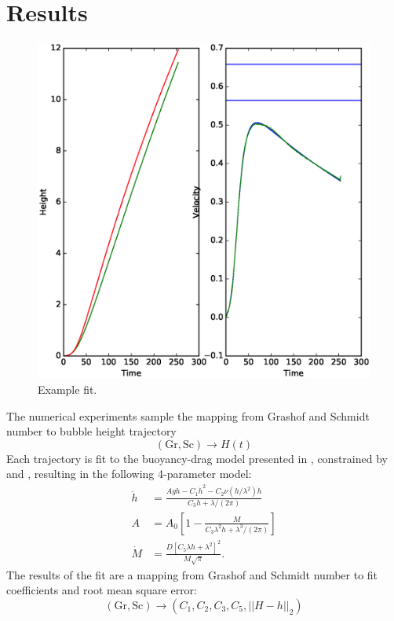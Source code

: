 \section{Results}

\newcommand{\fittol}[0]{0.01~}

\begin{figure}
\includegraphics[width=\columnwidth]{figs/H-0.0016-0.0002.eps}
\caption{ 
  Example fit.
}
\end{figure}

The numerical experiments sample the mapping from Grashof and Schmidt number to bubble height trajectory
\begin{equation*}
\left(\text{Gr}, \text{Sc}\right) \rightarrow H(t)
\end{equation*}
Each trajectory is fit to the buoyancy-drag model presented in , constrained by  and , resulting in the following 4-parameter model:
\begin{align}
\ddot{h} &= \frac{A g h - C_1 \dot{h}^2 - C_2 \nu (h/\lambda^2) \dot{h}}{ C_3 h + \lambda/(2\pi) } \\
A &= A_0 \left[ 1 - \frac{M}{C_3 \lambda^2 h  + \lambda^3 / (2\pi)} \right]  \\
\dot{M} &= \frac{D \left[C_5 \lambda h + \lambda^2\right] ^2}{M \sqrt{\pi}} .
\end{align}
The results of the fit are a mapping from Grashof and Schmidt number to fit coefficients and root mean square error:
\begin{equation}
\left(\text{Gr}, \text{Sc}\right) \rightarrow \left(C_1, C_2, C_3, C_5, || H - h ||_2\right) 
\end{equation}

